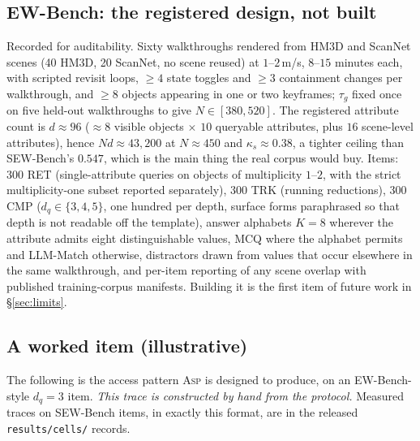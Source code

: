 \documentclass[10pt]{article}
\theoremstyle{definition}
\theoremstyle{plain}
\newcommand{\ASP}{\textsc{Asp}}
\begin{document}
\subsection{EW-Bench: the registered design, not built}
\label{app:ewdesign}
Recorded for auditability. Sixty walkthroughs rendered from HM3D \citep{hm3d} and ScanNet \citep{scannet} scenes (40 HM3D, 20 ScanNet, no scene reused) at $1$--$2$\,m/s, $8$--$15$ minutes each, with scripted revisit loops, $\ge4$ state toggles and $\ge3$ containment changes per walkthrough, and $\ge8$ objects appearing in one or two keyframes; $\tau_g$ fixed once on five held-out walkthroughs to give $N\in[380,520]$. The registered attribute count is $d\approx96$ ($\approx8$ visible objects $\times$ $10$ queryable attributes, plus $16$ scene-level attributes), hence $Nd\approx43{,}200$ at $N\approx450$ and $\kappa_s\approx0.38$, a tighter ceiling than SEW-Bench's $0.547$, which is the main thing the real corpus would buy. Items: $300$ RET (single-attribute queries on objects of multiplicity $1$--$2$, with the strict multiplicity-one subset reported separately), $300$ TRK (running reductions), $300$ CMP ($d_q\in\{3,4,5\}$, one hundred per depth, surface forms paraphrased so that depth is not readable off the template), answer alphabets $K{=}8$ wherever the attribute admits eight distinguishable values, MCQ where the alphabet permits and LLM-Match otherwise, distractors drawn from values that occur elsewhere in the same walkthrough, and per-item reporting of any scene overlap with published training-corpus manifests. Building it is the first item of future work in \S\ref{sec:limits}.

\subsection{A worked item (illustrative)}
\label{app:worked}
The following is the access pattern \ASP{} is designed to produce, on an EW-Bench-style $d_q{=}3$ item. \emph{This trace is constructed by hand from the protocol.} Measured traces on SEW-Bench items, in exactly this format, are in the released \texttt{results/cells/} records.
\end{document}
